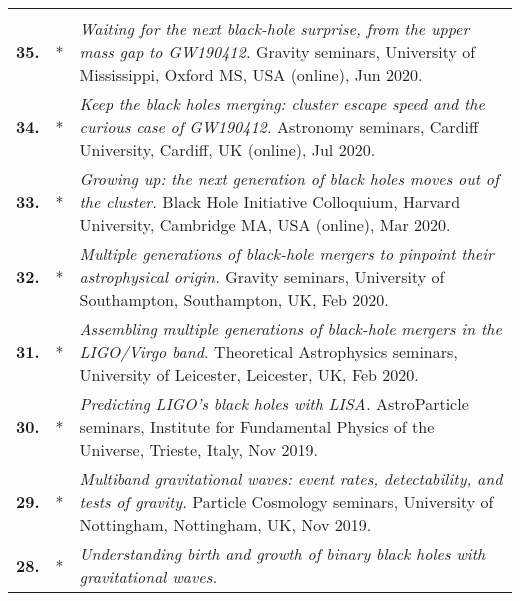 {\begin{longtable}{rp{0.3cm}p{15.8cm}}
\vspace{0.05cm}\\
%
\textbf{35.} & * & \textit{Waiting for the next black-hole surprise, from the upper mass gap to GW190412.}
\newline{}
Gravity seminars, University of Mississippi, Oxford MS, USA (online), Jun 2020.
\vspace{0.05cm}\\
%
\textbf{34.} & * & \textit{Keep the black holes merging: cluster escape speed and the curious case of GW190412.}
\newline{}
Astronomy seminars, Cardiff University, Cardiff, UK (online), Jul 2020.
\vspace{0.05cm}\\
%
\textbf{33.} & * & \textit{Growing up: the next generation of black holes moves out of the cluster.}
\newline{}
Black Hole Initiative Colloquium, Harvard University, Cambridge MA, USA (online), Mar 2020.
\vspace{0.05cm}\\
%
\textbf{32.} & * & \textit{Multiple generations of black-hole mergers to pinpoint their astrophysical origin.}
\newline{}
Gravity seminars, University of Southampton, Southampton, UK, Feb 2020.
\vspace{0.05cm}\\
%
\textbf{31.} & * & \textit{Assembling multiple generations of black-hole mergers in the LIGO/Virgo band.}
\newline{}
Theoretical Astrophysics seminars, University of Leicester, Leicester, UK, Feb 2020.
\vspace{0.05cm}\\
%
\textbf{30.} & * & \textit{Predicting LIGO's black holes with LISA.}
\newline{}
AstroParticle seminars, Institute for Fundamental Physics of the Universe, Trieste, Italy, Nov 2019.
\vspace{0.05cm}\\
%
\textbf{29.} & * & \textit{Multiband gravitational waves: event rates, detectability, and tests of gravity.}
\newline{}
Particle Cosmology seminars, University of Nottingham, Nottingham, UK, Nov 2019.
\vspace{0.05cm}\\
%
\textbf{28.} & * & \textit{Understanding birth and growth of binary black holes with gravitational waves.}
\newline{}

\end{longtable}}
